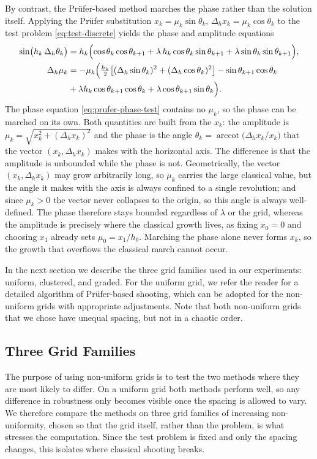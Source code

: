 \documentclass[12pt,reqno]{amsart}
\numberwithin{equation}{section}
\begin{document}
By contrast, the Pr\"ufer-based method marches the phase rather than the solution itself. Applying the Pr\"ufer substitution $x_k = \mu_k\sin\theta_k$, $\Delta_h x_k = \mu_k\cos\theta_k$ to the test problem \eqref{eq:test-discrete} yields the phase and amplitude equations
\begin{align}
\sin\bigl(h_k\,\Delta_h\theta_k\bigr) &= h_k\Bigl(\cos\theta_k\cos\theta_{k+1} + \lambda\, h_k\cos\theta_k\sin\theta_{k+1} + \lambda\sin\theta_k\sin\theta_{k+1}\Bigr), \label{eq:prufer-phase-test} \\
\Delta_h\mu_k &= -\mu_k\Bigl(\tfrac{h_k}{2}\bigl[(\Delta_h\sin\theta_k)^2 + (\Delta_h\cos\theta_k)^2\bigr] - \sin\theta_{k+1}\cos\theta_k\notag\\ &+ \lambda h_k\cos\theta_{k+1}\cos\theta_k + \lambda\cos\theta_{k+1}\sin\theta_k\Bigr). \label{eq:prufer-amp-test}
\end{align}
The phase equation \eqref{eq:prufer-phase-test} contains no $\mu_k$, so the phase can be marched on its own. Both quantities are built from the $x_k$: the amplitude is $\mu_k = \sqrt{x_k^2 + (\Delta_h x_k)^2}$ and the phase is the angle $\theta_k = \operatorname{arccot}\!\bigl(\Delta_h x_k / x_k\bigr)$ that the vector $(x_k, \Delta_h x_k)$ makes with the horizontal axis. The difference is that the amplitude is unbounded while the phase is not. Geometrically, the vector $(x_k, \Delta_h x_k)$ may grow arbitrarily long, so $\mu_k$ carries the large classical value, but the angle it makes with the axis is always confined to a single revolution; and since $\mu_k > 0$ the vector never collapses to the origin, so this angle is always well-defined. The phase therefore stays bounded regardless of $\lambda$ or the grid, whereas the amplitude is precisely where the classical growth lives, as fixing $x_0 = 0$ and choosing $x_1$ already sets $\mu_0 = x_1/h_0$. Marching the phase alone never forms $x_k$, so the growth that overflows the classical march cannot occur.

In the next section we describe the three grid families used in our experiments: uniform, clustered, and graded. For the uniform grid, we refer the reader \cite{cetinkaya-er-menken} for a detailed algorithm of Pr\"ufer-based shooting, which can be adopted for the non-uniform grids with appropriate adjustments. Note that both non-uniform grids that we chose have unequal spacing, but not in a chaotic order.


\subsection{Three Grid Families}
\label{gridfam}
The purpose of using non-uniform grids is to test the two methods where they are most likely to differ. On a uniform grid both methods perform well, so any difference in robustness only becomes visible once the spacing is allowed to vary. We therefore compare the methods on three grid families of increasing non-uniformity, chosen so that the grid itself, rather than the problem, is what stresses the computation. Since the test problem is fixed and only the spacing changes, this isolates where classical shooting breaks.
\end{document}
